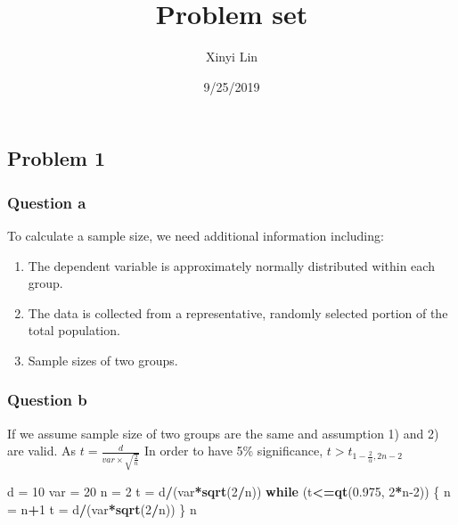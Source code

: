 \documentclass[]{article}
\title{Problem set}
\author{Xinyi Lin}
\date{9/25/2019}
\newenvironment{Shaded}{\begin{snugshade}}{\end{snugshade}}
\newcommand{\ControlFlowTok}[1]{\textcolor[rgb]{0.13,0.29,0.53}{\textbf{#1}}}
\newcommand{\DecValTok}[1]{\textcolor[rgb]{0.00,0.00,0.81}{#1}}
\newcommand{\FloatTok}[1]{\textcolor[rgb]{0.00,0.00,0.81}{#1}}
\newcommand{\KeywordTok}[1]{\textcolor[rgb]{0.13,0.29,0.53}{\textbf{#1}}}
\newcommand{\NormalTok}[1]{#1}
\newcommand{\OperatorTok}[1]{\textcolor[rgb]{0.81,0.36,0.00}{\textbf{#1}}}
\newcommand{\StringTok}[1]{\textcolor[rgb]{0.31,0.60,0.02}{#1}}
\begin{document}
\maketitle

\hypertarget{problem-1}{%
\subsection{Problem 1}\label{problem-1}}

\hypertarget{question-a}{%
\subsubsection{Question a}\label{question-a}}

To calculate a sample size, we need additional information including:

\begin{enumerate}
\def\labelenumi{\arabic{enumi})}
\item
  The dependent variable is approximately normally distributed within
  each group.
\item
  The data is collected from a representative, randomly selected portion
  of the total population.
\item
  Sample sizes of two groups.
\end{enumerate}

\hypertarget{question-b}{%
\subsubsection{Question b}\label{question-b}}

If we assume sample size of two groups are the same and assumption 1)
and 2) are valid. As \(t = \frac{d}{var\times\sqrt{\frac{2}{n}}}\) In
order to have 5\% significance, \(t>t_{1-\frac{2}{\alpha},2n-2}\)

\begin{Shaded}
\begin{Highlighting}[]
\NormalTok{d =}\StringTok{ }\DecValTok{10}
\NormalTok{var =}\StringTok{ }\DecValTok{20}
\NormalTok{n =}\StringTok{ }\DecValTok{2}
\NormalTok{t =}\StringTok{ }\NormalTok{d}\OperatorTok{/}\NormalTok{(var}\OperatorTok{*}\KeywordTok{sqrt}\NormalTok{(}\DecValTok{2}\OperatorTok{/}\NormalTok{n))}
\ControlFlowTok{while}\NormalTok{ (t}\OperatorTok{<=}\KeywordTok{qt}\NormalTok{(}\FloatTok{0.975}\NormalTok{, }\DecValTok{2}\OperatorTok{*}\NormalTok{n}\DecValTok{-2}\NormalTok{)) \{}
\NormalTok{  n =}\StringTok{ }\NormalTok{n}\OperatorTok{+}\DecValTok{1}
\NormalTok{  t =}\StringTok{ }\NormalTok{d}\OperatorTok{/}\NormalTok{(var}\OperatorTok{*}\KeywordTok{sqrt}\NormalTok{(}\DecValTok{2}\OperatorTok{/}\NormalTok{n))}
\NormalTok{\}}
\NormalTok{n}
\end{Highlighting}
\end{Shaded}
\end{document}
